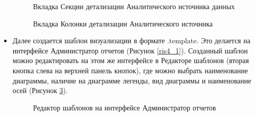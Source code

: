 \documentclass[a4paper]{extarticle}
\numberwithin{equation}{section}
\begin{document}
\begin{itemize}
\begin{figure}[H]
\caption{Вкладка Секции детализации Аналитического источника данных}
\label{ris3_2}
\end{figure}\par
\begin{figure}[H]
\caption{Вкладка Колонки детализации Аналитического источника}
\label{ris3_3}
\end{figure}\par
	\item Далее создается шаблон визуализации в формате .template. Это делается на интерфейсе Администратор отчетов (Рисунок \ref{ris4_1}). Созданный шаблон можно редактировать на этом же интерфейсе в Редакторе шаблонов (вторая кнопка слева на верхней панель кнопок), где можно выбрать наименование диаграммы, наличие на диаграмме легенды, вид диаграммы и наименование осей (Рисунок \ref{ris5}).
\begin{figure}[H]
\caption{Редактор шаблонов на интерфейсе Администратор отчетов}
\label{ris5}
\end{figure}\par
\begin{figure}[H]

\end{figure}
\end{itemize}
\end{document}
